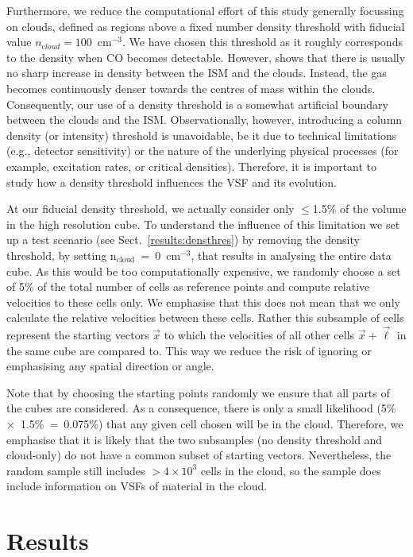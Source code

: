 \documentclass{aa}		%
\begin{document}
Furthermore, we reduce the computational effort of this study generally focussing on clouds, defined as regions above a fixed number density threshold with fiducial value $n_{\mathrm cloud} = 100$~cm$^{-3}$.  We have chosen this threshold as it roughly corresponds to the density when CO becomes detectable.
However,  shows that there is usually no sharp increase in density between the ISM and the clouds. 
Instead, the gas becomes continuously denser towards the centres of mass within the clouds. 
Consequently, our use of a density threshold is a somewhat artificial boundary between the clouds and the ISM. Observationally, however, introducing a column density (or intensity) threshold is unavoidable, be it due to technical limitations (e.g., detector sensitivity) or the nature of the underlying physical processes (for example, excitation rates, or critical densities).
Therefore, it is important to study how a density threshold influences the VSF and its evolution.

At our fiducial density threshold, we actually consider only $\leq$1.5\% of the volume in the high resolution cube.
To understand the influence of this limitation we set up a test scenario (see Sect.~\ref{results:densthres}) by removing the density threshold, by setting n$_\mathrm{cloud}$~=~0~cm$^{-3}$, that results in analysing the entire data cube.
As this would be too computationally expensive, we randomly choose a set of 5\% of the total number of cells as reference points and compute relative velocities to these cells only.
We emphasise that this does not mean that we only calculate the relative velocities between these cells.
Rather this subsample of cells represent the starting vectors $\vec{x}$ to which the velocities of all other cells $\vec{x} + \vec{\ell}$ in the same cube are compared to.
This way we reduce the risk of ignoring or emphasising any spatial direction or angle.

Note that by choosing the starting points randomly we ensure that all parts of the cubes are considered. 
As a consequence, there is only a small likelihood (5\%~$\times$~1.5\%~=~0.075\%) that any given cell chosen will be in the cloud.
Therefore, we emphasise that it is likely that the two subsamples (no density threshold and cloud-only) do not have a common subset of starting vectors.
Nevertheless, the random sample still includes $>4 \times 10^3$ cells in the cloud, so the sample does include information on VSFs of material in the cloud.


\section{Results}\label{results}
\end{document}
